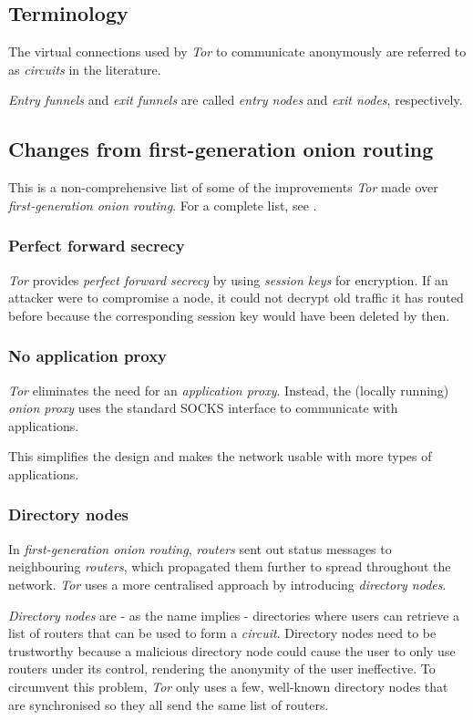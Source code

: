 \documentclass{sig-alternate}
\begin{document}
\subsection{Terminology}
The virtual connections used by \emph{Tor} to communicate anonymously are referred to as \emph{circuits}
in the literature.

\emph{Entry funnels} and \emph{exit funnels} are called \emph{entry nodes} and \emph{exit nodes},
respectively.

\subsection{Changes from first-generation onion routing}
This is a non-comprehensive list of some of the improvements \emph{Tor} made over 
\emph{first-generation onion routing}. For a complete list, see \cite{tor2004}.

\subsubsection{Perfect forward secrecy}
\emph{Tor} provides \emph{perfect forward secrecy} by using \emph{session keys} for encryption.
If an attacker were to compromise a node, it could not decrypt old traffic it has routed before
because the corresponding session key would have been deleted by then.

\subsubsection{No application proxy}
\emph{Tor} eliminates the need for an \emph{application proxy}. Instead, the (locally running) 
\emph{onion proxy} uses the standard SOCKS interface to communicate with applications.

This simplifies the design and makes the network usable with more types of applications.

\subsubsection{Directory nodes}
In \emph{first-generation onion routing}, \emph{routers} sent out status messages to neighbouring
\emph{routers}, which propagated them further to spread throughout the network. \emph{Tor} uses
a more centralised approach by introducing \emph{directory nodes}.

\emph{Directory nodes} are - as the name implies - directories where users can retrieve a list of
routers that can be used to form a \emph{circuit}. Directory nodes need to be trustworthy because
a malicious directory node could cause the user to only use routers under its control, rendering
the anonymity of the user ineffective. To circumvent this problem, \emph{Tor} only uses a few,
well-known directory nodes that are synchronised so they all send the same list of routers. \cite{tor2004}
\end{document}
